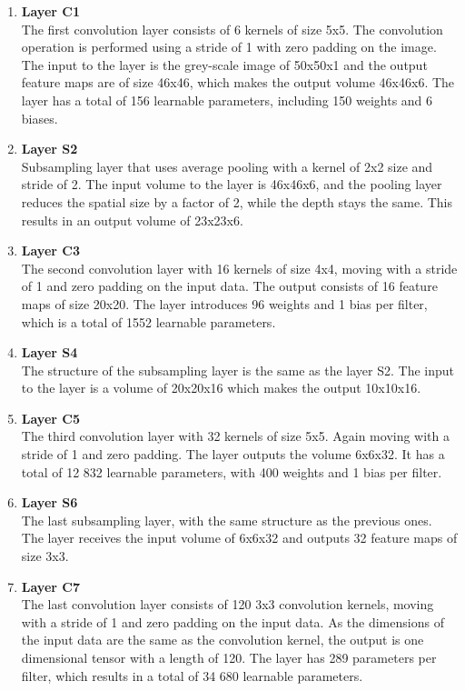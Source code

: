 \begin{enumerate}
    \item \textbf{Layer C1} \\
    The first convolution layer consists of 6 kernels of size 5x5. The convolution operation is performed using a stride of 1 with zero padding on the image. The input to the layer is the grey-scale image of 50x50x1 and the output feature maps are of size 46x46, which makes the output volume 46x46x6. The layer has a total of 156 learnable parameters, including 150 weights and 6 biases. 
    
    \item \textbf{Layer S2} \\
    Subsampling layer that uses average pooling with a kernel of 2x2 size and stride of 2. The input volume to the layer is 46x46x6, and the pooling layer reduces the spatial size by a factor of 2, while the depth stays the same. This results in an output volume of 23x23x6.
    
    \item \textbf{Layer C3} \\
    The second convolution layer with 16 kernels of size 4x4, moving with a stride of 1 and zero padding on the input data. The output consists of 16 feature maps of size 20x20. The layer introduces 96 weights and 1 bias per filter, which is a total of 1552 learnable parameters.
    
    \item \textbf{Layer S4} \\
    The structure of the subsampling layer is the same as the layer S2. The input to the layer is a volume of 20x20x16 which makes the output 10x10x16.
    
    \item \textbf{Layer C5} \\
    The third convolution layer with 32 kernels of size 5x5. Again moving with a stride of 1 and zero padding. The layer outputs the volume 6x6x32. It has a total of 12 832 learnable parameters, with 400 weights and 1 bias per filter. 
    
    \item \textbf{Layer S6} \\
    The last subsampling layer, with the same structure as the previous ones. The layer receives the input volume of 6x6x32 and outputs 32 feature maps of size 3x3.
    
    \item \textbf{Layer C7} \\
    The last convolution layer consists of 120 3x3 convolution kernels, moving with a stride of 1 and zero padding on the input data. As the dimensions of the input data are the same as the convolution kernel, the output is one dimensional tensor with a length of 120. The layer has 289 parameters per filter, which results in a total of 34 680 learnable parameters. 
    

\end{enumerate}
